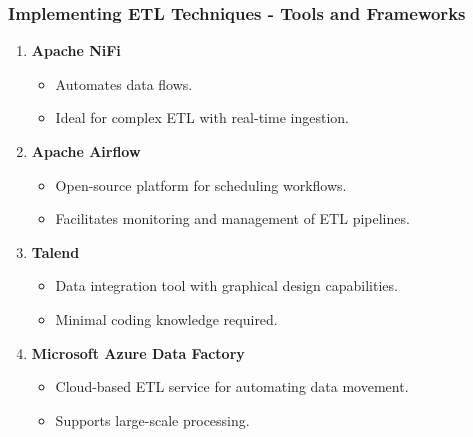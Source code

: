 \documentclass[aspectratio=169]{beamer}
\begin{document}
\begin{frame}[fragile]
    \frametitle{Implementing ETL Techniques - Tools and Frameworks}
    \begin{enumerate}
        \item \textbf{Apache NiFi}
            \begin{itemize}
                \item Automates data flows.
                \item Ideal for complex ETL with real-time ingestion.
            \end{itemize}
        
        \item \textbf{Apache Airflow}
            \begin{itemize}
                \item Open-source platform for scheduling workflows.
                \item Facilitates monitoring and management of ETL pipelines.
            \end{itemize}

        \item \textbf{Talend}
            \begin{itemize}
                \item Data integration tool with graphical design capabilities.
                \item Minimal coding knowledge required.
            \end{itemize}

        \item \textbf{Microsoft Azure Data Factory}
            \begin{itemize}
                \item Cloud-based ETL service for automating data movement.
                \item Supports large-scale processing.
            \end{itemize}
    \end{enumerate}
\end{frame}
\end{document}
